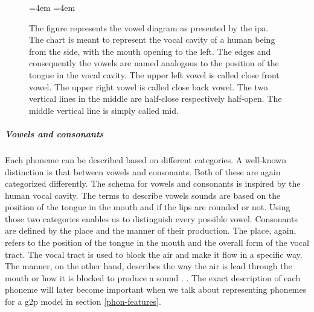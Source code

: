 \begin{figure}[t!]
{\large
\vowelvunit=4em
\vowelhunit=4em
\begin{center}
\begin{vowel}
\end{vowel}
\end{center}}
\caption[Vowel chart]{The figure represents the vowel diagram as presented by the \ac{ipa}. The chart is meant to represent the vocal cavity of a human being from the side, with the mouth opening to the left. The edges and consequently the vowels are named analogous to the position of the tongue in the vocal cavity. The upper left vowel is called close front vowel. The upper right vowel is called close back vowel. The two vertical lines in the middle are half-close respectively half-open. The middle vertical line is simply called mid. }
\label{fig:vowel-diagram}
\end{figure}

\subparagraph{Vowels and consonants} Each phoneme can be described based on different categories. A well-known distinction is that between vowels and consonants. Both of these are again categorized differently. The schema for vowels and consonants is inspired by the human vocal cavity. The terms to describe vowels sounds are based on the position of the tongue in the mouth and if the lips are rounded or not. Using those two categories enables us to distinguish every possible vowel. Consonants are defined by the place and the manner of their production. The place, again, refers to the position of the tongue in the mouth and the overall form of the vocal tract. The vocal tract is used to block the air and make it flow in a specific way. The manner, on the other hand, describes the way the air is lead through the mouth or how it is blocked to produce a sound \citep{phonetics-video}. . The exact description of each phoneme will later become important when we talk about representing phonemes for a \ac{g2p} model in section \ref{phon-features}. 

